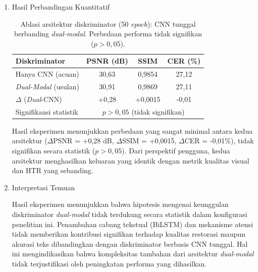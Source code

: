 \begin{enumerate}[leftmargin=1.5em, labelsep=0.5em, itemindent=0pt, noitemsep, topsep=0pt]
    \item Hasil Perbandingan Kuantitatif
          \begin{table}[!htbp]
              \caption[Ablasi diskriminator dual-modal berbanding CNN]{Ablasi arsitektur diskriminator (50 \textit{epoch}): CNN tunggal berbanding \textit{dual-modal}. Perbedaan performa tidak signifikan ($p>0,05$).}
              \label{tab:diskriminator-ablasi}
              \small
              \begin{tabularx}{\textwidth}{|>{\raggedright\arraybackslash}X|c|c|c|}
                  \hline
                  \textbf{Diskriminator}                & \textbf{PSNR (dB)}                                         & \textbf{SSIM}    & \textbf{CER (\%)} \\
                  \hline
                  Hanya CNN (acuan)         & 30,63                                             & 0,9854  & 27,12    \\
                  \textit{Dual-Modal} (usulan)        & 30,91                                             & 0,9869  & 27,11    \\
                  \hline
                  $\Delta$ (\textit{Dual}-CNN) & +0,28                                             & +0,0015 & -0,01    \\
                  Signifikansi statistik       & \multicolumn{3}{c|}{$p > 0,05$ (tidak signifikan)}                      \\
                  \hline
              \end{tabularx}
          \end{table}
          \noindent Hasil eksperimen menunjukkan perbedaan yang sangat minimal antara kedua arsitektur ($\Delta$PSNR = +0,28 dB, $\Delta$SSIM = +0,0015, $\Delta$CER = -0,01\%), tidak signifikan secara statistik ($p > 0,05$). Dari perspektif pengguna, kedua arsitektur menghasilkan keluaran yang identik dengan metrik kualitas visual dan HTR yang sebanding.

    \item Interpretasi Temuan

          Hasil eksperimen menunjukkan bahwa hipotesis mengenai keunggulan diskriminator \textit{dual-modal} tidak terdukung secara statistik dalam konfigurasi penelitian ini. Penambahan cabang tekstual (BiLSTM) dan mekanisme atensi tidak memberikan kontribusi signifikan terhadap kualitas restorasi maupun akurasi teks dibandingkan dengan diskriminator berbasis CNN tunggal. Hal ini mengindikasikan bahwa kompleksitas tambahan dari arsitektur \textit{dual-modal} tidak terjustifikasi oleh peningkatan performa yang dihasilkan.


\end{enumerate}

